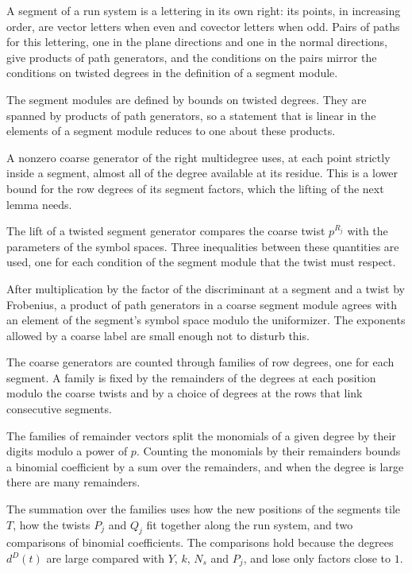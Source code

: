 A segment of a run system is a lettering in its own right: its points, in increasing order, are vector
letters when even and covector letters when odd. Pairs of paths for this lettering, one in the plane
directions and one in the normal directions, give products of path generators, and the conditions on
the pairs mirror the conditions on twisted degrees in the definition of a segment module.

The segment modules are defined by bounds on twisted degrees. They are spanned by products of path
generators, so a statement that is linear in the elements of a segment module reduces to one about
these products.

A nonzero coarse generator of the right multidegree uses, at each point strictly inside a segment, almost
all of the degree available at its residue. This is a lower bound for the row degrees of its segment
factors, which the lifting of the next lemma needs.

The lift of a twisted segment generator compares the coarse twist $p^{R_j}$ with the parameters of the
symbol spaces. Three inequalities between these quantities are used, one for each condition of the
segment module that the twist must respect.

After multiplication by the factor of the discriminant at a segment and a twist by Frobenius, a product
of path generators in a coarse segment module agrees with an element of the segment's symbol space
modulo the uniformizer. The exponents allowed by a coarse label are small enough not to disturb this.

The coarse generators are counted through families of row degrees, one for each segment. A family is fixed
by the remainders of the degrees at each position modulo the coarse twists and by a choice of degrees at the
rows that link consecutive segments.

The families of remainder vectors split the monomials of a given degree by their digits modulo a power of $p$.
Counting the monomials by their remainders bounds a binomial coefficient by a sum over the remainders, and when the
degree is large there are many remainders.

The summation over the families uses how the new positions of the segments tile $T$, how the twists $P_j$ and $Q_j$
fit together along the run system, and two comparisons of binomial coefficients. The comparisons hold because the
degrees $d^D(t)$ are large compared with $Y$, $k$, $N_s$ and $P_j$, and lose only factors close to $1$.

